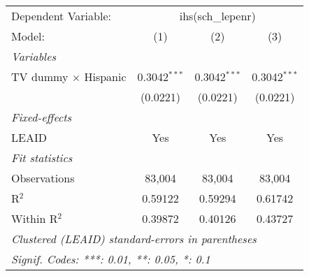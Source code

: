 \begin{tabular}{lccc}
\tabularnewline\midrule\midrule
Dependent Variable:&\multicolumn{3}{c}{ihs(sch\_lepenr)}\\
Model:&(1) & (2) & (3)\\
\midrule \emph{Variables}&   &   &  \\
TV dummy $\times$ Hispanic & 0.3042$^{***}$ & 0.3042$^{***}$ & 0.3042$^{***}$\\
  &(0.0221) & (0.0221) & (0.0221)\\
\midrule \emph{Fixed-effects}&   &   &  \\
LEAID & Yes & Yes & Yes\\
\midrule \emph{Fit statistics}&  & & \\
Observations & 83,004&83,004&83,004\\
R$^2$ & 0.59122&0.59294&0.61742\\
Within R$^2$ & 0.39872&0.40126&0.43727\\
\midrule\midrule\multicolumn{4}{l}{\emph{Clustered (LEAID) standard-errors in parentheses}}\\
\multicolumn{4}{l}{\emph{Signif. Codes: ***: 0.01, **: 0.05, *: 0.1}}\\
\end{tabular}


